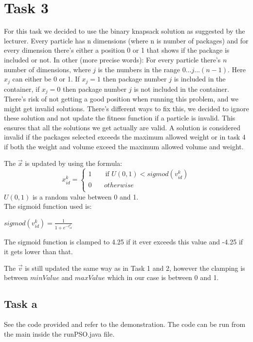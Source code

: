 \documentclass[12pt, a4paper]{article}
\begin{document}
\section{Task 3}\label{3}
For this task we decided to use the binary knapsack solution as suggested by the lecturer. Every particle has n dimensions (where n is number of packages) and for every dimension there's either a position 0 or 1 that shows if the package is included or not.
In other (more precise words):
For every particle there's $n$ number of dimensions, where $j$ is the numbers in the range $0...j...(n-1)$. Here $x_j$ can either be 0 or 1.
If $x_j = 1$ then package number $j$ is included in the container, if $x_j = 0$ then package number $j$ is not included in the container.\\
There's risk of not getting a good position when running this problem, and we might get invalid solutions. There's different ways to fix this, we decided to ignore these solution and not update the fitness function if a particle is invalid. This ensures that all the solutions we get actually are valid. A solution is considered invalid if the packages selected exceeds the maximum allowed weight or in task 4 if both the weight and volume exceed the maximum allowed volume and weight.


The $ \vec{x} $ is updated by using the formula:
\begin{equation}
x^k_{id}=\begin{cases}
    1 \quad \phantom{\infty}\text{if}\,\, U(0,1) < sigmod(v^k_{id})  \\
    0 \quad \phantom{0}  \,\, otherwise \\
      \end{cases}
\end{equation} 
$U(0,1)$ is a random value between 0 and 1.\\
The sigmoid function used is:
\begin{center}
$sigmod(v^k_{id})=\frac{1}{1+e^{-v^k_{id}}}$
\end{center}
The sigmoid function is clamped to 4.25 if it ever exceeds this value and -4.25 if it gets lower than that.

The $\vec{v}$ is still updated the same way as in Task 1 and 2, however the clamping is between $minValue$ and $maxValue$ which in our case is between 0 and 1.
\subsection{Task a}
See the code provided and refer to the demonstration.
The code can be run from the main inside the runPSO.java file.
\end{document}
